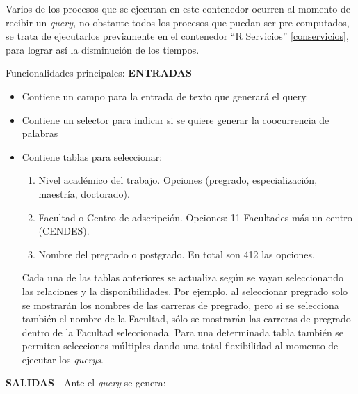 \documentclass[
  10,
  openany]{book}
\providecommand{\tightlist}{%
  \setlength{\itemsep}{0pt}\setlength{\parskip}{0pt}}
\begin{document}
Varios de los procesos que se ejecutan en este contenedor ocurren al momento de recibir un \emph{query,} no obstante todos los procesos que puedan ser pre computados, se trata de ejecutarlos previamente en el contenedor ``R Servicios'' \ref{conservicios}, para lograr así la disminución de los tiempos.

Funcionalidades principales: \textbf{ENTRADAS}

\begin{itemize}
\item
  Contiene un campo para la entrada de texto que generará el query.
\item
  Contiene un selector para indicar si se quiere generar la coocurrencia de palabras
\item
  Contiene tablas para seleccionar:

  \begin{enumerate}
  \def\labelenumi{\arabic{enumi})}
  \tightlist
  \item
    Nivel académico del trabajo. Opciones (pregrado, especialización, maestría, doctorado).
  \item
    Facultad o Centro de adscripción. Opciones: 11 Facultades más un centro (CENDES).
  \item
    Nombre del pregrado o postgrado. En total son 412 las opciones.
  \end{enumerate}

  Cada una de las tablas anteriores se actualiza según se vayan seleccionando las relaciones y la disponibilidades. Por ejemplo, al seleccionar pregrado solo se mostrarán los nombres de las carreras de pregrado, pero si se selecciona también el nombre de la Facultad, sólo se mostrarán las carreras de pregrado dentro de la Facultad seleccionada. Para una determinada tabla también se permiten selecciones múltiples dando una total flexibilidad al momento de ejecutar los \emph{querys}.
\end{itemize}

\textbf{SALIDAS} - Ante el \emph{query} se genera:
\end{document}
